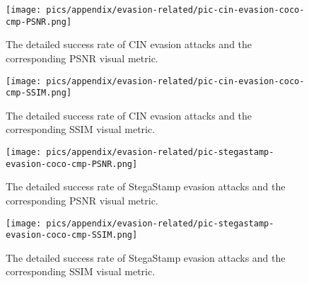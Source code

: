 \begin{figure}[!t]
\begin{minipage}{0.48\linewidth}
    \centering
    \texttt{[image: pics/appendix/evasion-related/pic-cin-evasion-coco-cmp-PSNR.png]} 
    
    \vspace{-6mm}
    \caption{The detailed success rate of CIN evasion attacks and the corresponding PSNR visual metric.}
    \label{fig:evasion-related-cin-psnr}
\end{minipage}\hfill
\begin{minipage}{0.48\linewidth}
    \centering
    \texttt{[image: pics/appendix/evasion-related/pic-cin-evasion-coco-cmp-SSIM.png]} 
    
    \vspace{-6mm}
    \caption{The detailed success rate of CIN evasion attacks and the corresponding SSIM visual metric.}
    \label{fig:evasion-related-cin-ssim}
\end{minipage}
\end{figure}

\begin{figure}[!t]
\begin{minipage}{0.48\linewidth}
    \centering
    \texttt{[image: pics/appendix/evasion-related/pic-stegastamp-evasion-coco-cmp-PSNR.png]} 
    
    \vspace{-6mm}
    \caption{The detailed success rate of StegaStamp evasion attacks and the corresponding PSNR visual metric.}
    \label{fig:evasion-related-stegastamp-psnr}
\end{minipage}\hfill
\begin{minipage}{0.48\linewidth}
    \centering
    \texttt{[image: pics/appendix/evasion-related/pic-stegastamp-evasion-coco-cmp-SSIM.png]} 
    
    \vspace{-6mm}
    \caption{The detailed success rate of StegaStamp evasion attacks and the corresponding SSIM visual metric.}
    \label{fig:evasion-related-stegastamp-ssim}
\end{minipage}
\end{figure}

